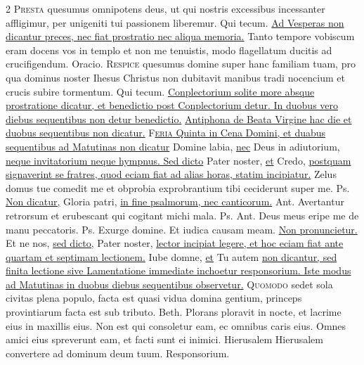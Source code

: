 \begin{multicols*}{2}
\lettrine[lines=2]{\zallmancaps \color{Blue} P}{resta} quesumus omnipotens deus, ut qui nostris excessibus incessanter affligimur, per unigeniti tui passionem liberemur. Qui tecum.
\newline \ul{Ad Vesperas non dicantur preces, nec fiat prostratio nec aliqua memoria.}
 Tanto tempore vobiscum eram docens vos in templo et non me tenuistis, modo flagellatum ducitis ad crucifigendum. {\color{Red} Oracio.}
\lettrine[lines=2]{\zallmancaps \color{Red} R}{espice} \hypertarget{respice-oratio}{\label{respice-oratio}} quesumus domine super hanc familiam tuam, pro qua dominus noster Ihesus Christus non dubitavit manibus tradi nocencium et crucis subire tormentum. Qui tecum.
\newline \ul{Conplectorium solite more absque prostratione dicatur, et benedictio post Conplectorium detur. In duobus vero diebus sequentibus non detur benedictio.}
\newline \ul{Antiphona de Beata Virgine hac die et duobus sequentibus non dicatur.}
{\color{Red} }
\lettrine[lines=2]{\zallmancaps \color{Blue} F}{}\ul{\textsc{eria} Quinta in Cena Domini, et duabus sequentibus ad Matutinas non dicatur} Domine labia, \ul{nec} Deus in adiutorium, \ul{neque invitatorium neque hympnus. Sed dicto} Pater noster, \ul{et} Credo, \ul{postquam signaverint se fratres, quod eciam fiat ad alias horas, statim incipiatur.}
 Zelus domus tue comedit me et obprobia exprobrantium tibi ceciderunt super me. {\color{Red} Ps.}  \ul{Non dicatur,} Gloria patri, \ul{in fine psalmorum, nec canticorum.} {\color{Red} Ant.} Avertantur retrorsum et erubescant qui cogitant michi mala. {\color{Red} Ps.}  {\color{Red} Ant.} Deus meus eripe me de manu peccatoris. {\color{Red} Ps.}  \V Exurge domine. \R Et iudica causam meam. \ul{Non pronuncietur.} Et ne nos, \ul{sed dicto,} Pater noster, \ul{lector incipiat legere, et hoc eciam fiat ante quartam et septimam lectionem.} Iube domne, \ul{et} Tu autem \ul{non dicantur, sed finita lectione sive Lamentatione immediate inchoetur responsorium. Iste modus ad Matutinas in duobus diebus sequentibus observetur.}
\lettrine[lines=2]{\zallmancaps \color{Red} Q}{uomodo} sedet sola civitas plena populo, facta est quasi vidua domina gentium, princeps provintiarum facta est sub tributo. {\color{Red} Beth.} Plorans ploravit in nocte, et lacrime eius in maxillis eius. Non est qui consoletur eam, ec omnibus caris eius. Omnes amici eius spreverunt eam, et facti sunt ei inimici. Hierusalem Hierusalem convertere ad dominum deum tuum. {\color{Red} Responsorium.}

\end{multicols*}
